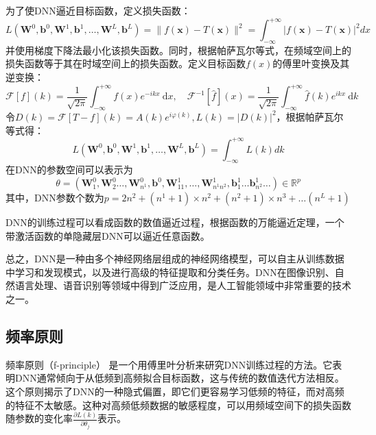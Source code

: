为了使DNN逼近目标函数，定义损失函数：
\begin{equation}
    L\left(\boldsymbol{W}^{0}, \boldsymbol{b}^{0}, \boldsymbol{W}^{1}, \boldsymbol{b}^{1}, \ldots, \boldsymbol{W}^{L}, \boldsymbol{b}^{L}\right)=\|f(\boldsymbol{x})-T(\boldsymbol{x})\|^{2}=\int_{-\infty}^{+\infty}|f(\boldsymbol{x})-T(\boldsymbol{x})|^{2} dx
\end{equation}
并使用梯度下降法最小化该损失函数。同时，根据帕萨瓦尔等式\cite{姚端正1997数学物理方法,hughes1965physical}，在频域空间上的损失函数等于其在时域空间上的损失函数。定义目标函数$f(x)$的傅里叶变换及其逆变换：
\begin{equation}
    \mathcal{F}[f](k)=\frac{1}{\sqrt{2 \pi}} \int_{-\infty}^{+\infty} f(x) e^{-i k x} \mathrm{~d} x, \quad \mathcal{F}^{-1}[\widehat{f}](x)=\frac{1}{\sqrt{2 \pi}} \int_{-\infty}^{+\infty} \hat{f}(k) e^{i k x} \mathrm{~d} k
\end{equation}
令$D(k)=\mathcal{F}[T-f](k)=A(k) e^{i \varphi(k)}, L(k)=|D(k)|^{2}$，根据帕萨瓦尔等式得：
\begin{equation}
L\left(\boldsymbol{W}^0, \boldsymbol{b}^0, \boldsymbol{W}^1, \boldsymbol{b}^1, \ldots, \boldsymbol{W}^L, \boldsymbol{b}^L\right)=\int_{-\infty}^{+\infty} L(k) dk
\end{equation}
在DNN的参数空间可以表示为
\begin{equation}
\theta=\left(\boldsymbol{W}_1^0, \boldsymbol{W}_2^0 \ldots, \boldsymbol{W}_{n^1}^0, \boldsymbol{b}^0, \boldsymbol{W}_{11}^1, \ldots, \boldsymbol{W}_{n^1 n^2}^1, \boldsymbol{b}_1^1 \ldots \boldsymbol{b}_{n^2}^1 \ldots\right) \in \mathbb{R}^p
\end{equation}
其中，DNN参数个数为$p=2n^2+\left(n^1+1\right) \times n^2+\left(n^2+1\right) \times n^3+\ldots\left(n^L+1\right)$

DNN的训练过程可以看成函数的数值逼近过程，根据函数的万能逼近定理，一个带激活函数的单隐藏层DNN可以逼近任意函数\cite{cybenko1989approximation}。

总之，DNN是一种由多个神经网络层组成的神经网络模型，可以自主从训练数据中学习和发现模式，以及进行高级的特征提取和分类任务。DNN在图像识别、自然语言处理、语音识别等领域中得到广泛应用，是人工智能领域中非常重要的技术之一。
\subsection{频率原则}
频率原则（f-principle）\cite{xu2019frequency} 是一个用傅里叶分析来研究DNN训练过程的方法。它表明DNN通常倾向于从低频到高频拟合目标函数，这与传统的数值迭代方法相反。这个原则揭示了DNN的一种隐式偏置，即它们更容易学习低频的特征，而对高频的特征不太敏感。这种对高频低频数据的敏感程度，可以用频域空间下的损失函数随参数的变化率$\frac{\partial L(k)}{\partial \theta_j}$表示。

